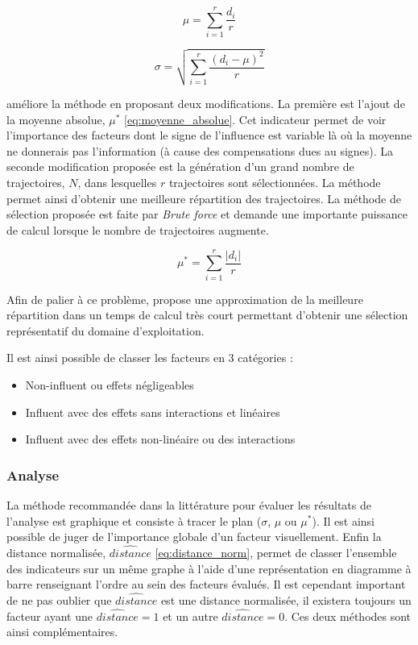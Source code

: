\begin{equation}\label{eq:moyenne}
    \mu = \sum_{i = 1}^{r} \frac{d_{i}}{r}
\end{equation}

\begin{equation}\label{eq:ecart_type}
    \sigma = \sqrt{\sum_{i=1}^{r}\frac{(d_{i} - \mu)^{2}}{r}}
\end{equation}

\cite{Campolongo20071509} améliore la méthode en proposant deux modifications. La première
est l’ajout de la moyenne absolue, $\mu^{*}$ \eqref{eq:moyenne_absolue}. Cet indicateur permet
de voir l’importance des facteurs dont le signe de l’influence est variable là où
la moyenne ne donnerais pas l’information (à cause des compensations dues au signes).
La seconde modification proposée est la génération d’un grand nombre de trajectoires, $N$,
dans lesquelles $r$ trajectoires sont sélectionnées. La méthode permet ainsi
d’obtenir une meilleure répartition des trajectoires.
La méthode de sélection proposée est faite par \emph{Brute force} et demande une
importante puissance de calcul lorsque le nombre de trajectoires augmente.

\begin{equation}\label{eq:moyenne_absolue}
    \mu^{*} = \sum_{i = 1}^{r} \frac{\lvert d_{i} \rvert}{r}
\end{equation}

Afin de palier à ce problème, \cite{Ruano2012103} propose une approximation de
la meilleure répartition dans un temps de calcul très court permettant d’obtenir
une sélection représentatif du domaine d’exploitation.

Il est ainsi possible de classer les facteurs en 3 catégories :
\begin{itemize}
  \item Non-influent ou effets négligeables
  \item Influent avec des effets sans interactions et linéaires
  \item Influent avec des effets non-linéaire ou des interactions
\end{itemize}


\subsubsection{Analyse} %
\label{ssub:analyse}
La méthode recommandée dans la littérature pour évaluer les résultats de l’analyse
est graphique et consiste à tracer le plan ($\sigma$, $\mu$ ou $\mu^{*}$). Il est
ainsi possible de juger de l’importance globale d’un facteur visuellement.
Enfin la distance normalisée, $\hat{distance}$ \eqref{eq:distance_norm}, permet
de classer l’ensemble des indicateurs sur un même graphe à l’aide d’une représentation
en diagramme à barre renseignant l’ordre au sein des facteurs évalués.
Il est cependant important de ne pas oublier que $\hat{distance}$ est une distance
normalisée, il existera toujours un facteur ayant une $\hat{distance} = 1$ et un autre
$\hat{distance} = 0$. Ces deux méthodes sont ainsi complémentaires.

